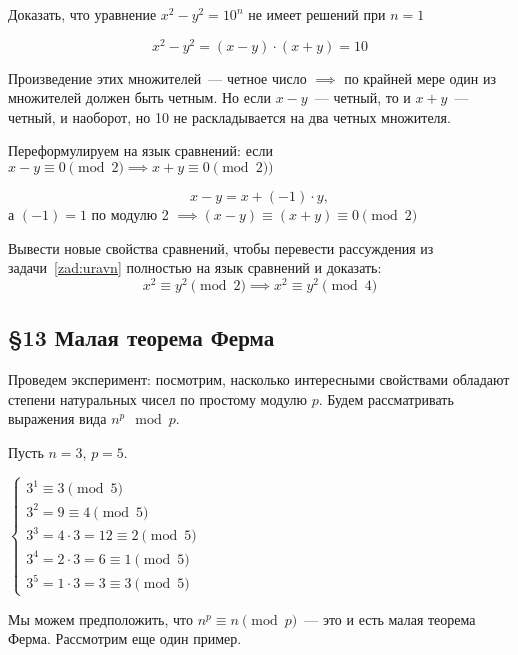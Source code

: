 \documentclass[russian]{lecture-notes}
\begin{document}
\begin{problem*}
	Доказать, что уравнение $x^2 - y^2 = 10^n$ не имеет решений при $n=1$
	
	\[ x^2 - y^2 = (x-y) \cdot (x+y) = 10 \]
	
	Произведение этих множителей~--- четное число $\implies$ по крайней мере один из множителей должен быть четным. Но если $x-y$~--- четный, то и $x+y$~--- четный, и наоборот, но 10 не раскладывается на два четных множителя.
	
	Переформулируем на язык сравнений: если $x-y \equiv 0 \pmod 2 \implies x+y \equiv 0 \pmod 2)$ 
	
	\[ x-y=x+(-1) \cdot y, \] а $(-1)=1$ по модулю 2 $\implies (x-y) \equiv (x+y) \equiv 0 \pmod 2$
	\label{zad:uravn} 
\end{problem*}

\begin{problem*}
	Вывести новые свойства сравнений, чтобы перевести рассуждения из задачи~\ref{zad:uravn} полностью на язык сравнений и доказать:
	\[
		x^2 \equiv y^2 \pmod 2 \implies x^2 \equiv y^2 \pmod 4
	\]
\end{problem*}

\begin{center}
	\section*{\LARGE\S 13 Малая теорема Ферма}
	\label{par:teorFerma}
\end{center}

Проведем эксперимент: посмотрим, насколько интересными свойствами обладают степени натуральных чисел по простому модулю $p$. Будем рассматривать выражения вида $n^p \mod p$.

\begin{example*}
	Пусть $n=3$, $p=5$.
	
	$\begin{cases}
		3^1 \equiv 3 \pmod 5
		\\
		3^2 = 9 \equiv 4 \pmod 5
		\\
		3^3 = 4 \cdot 3 = 12 \equiv 2 \pmod 5
		\\
		3^4 = 2 \cdot 3 = 6 \equiv 1 \pmod 5
		\\
		3^5 = 1 \cdot 3 = 3 \equiv 3 \pmod 5
	\end{cases}$
	\label{exp:sravn1}
\end{example*}

\noindent Мы можем предположить, что $n^p \equiv n \pmod p$~--- это и есть малая теорема Ферма. Рассмотрим еще один пример.
\end{document}
